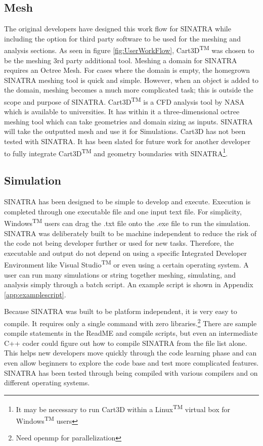 \subsection{Mesh}
The original developers have designed this work flow for SINATRA while including the option for third party software to be used for the meshing and analysis sections. As seen in figure \ref{fig:UserWorkFlow}, Cart3D\textsuperscript{TM} \cite{cart3d} was chosen to be the meshing 3rd party additional tool. Meshing a domain for SINATRA requires an Octree Mesh. For cases where the domain is empty, the homegrown SINATRA meshing tool is quick and simple. However, when an object is added to the domain, meshing becomes a much more complicated task; this is outside the scope and purpose of SINATRA. Cart3D\textsuperscript{TM} is a CFD analysis tool by NASA which is available to universities. It has within it a three-dimensional octree meshing tool which can take geometries and domain sizing as inputs. SINATRA will take the outputted mesh and use it for Simulations. Cart3D has not been tested with SINATRA. It has been slated for future work for another developer to fully integrate Cart3D\textsuperscript{TM} and geometry boundaries with SINATRA\footnote{It may be necessary to run Cart3D within a Linux\textsuperscript{TM} virtual box for Windows\textsuperscript{TM} users}. \par

\subsection{Simulation}

SINATRA has been designed to be simple to develop and execute. Execution is completed through one executable file and one input text file. For simplicity, Windows\textsuperscript{TM} users can drag the .txt file onto the .exe file to run the simulation. SINATRA was deliberately built to be machine independent to reduce the risk of the code not being developer further or used for new tasks. Therefore, the executable and output do not depend on using a specific Integrated Developer Environment like Visual Studio\textsuperscript{TM} or even using a certain operating system. A user can run many simulations or string together meshing, simulating, and analysis simply through a batch script. An example script is shown in Appendix \ref{app:examplescript}. \par
\indent Because SINATRA was built to be platform independent, it is very easy to compile. It requires only a single command with zero libraries.\footnote{Need openmp for parallelization} There are sample compile statements in the ReadME and compile scripts, but even an intermediate C++ coder could figure out how to compile SINATRA from the file list alone. This helps new developers move quickly through the code learning phase and can even allow beginners to explore the code base and test more complicated features. SINATRA has been tested through being compiled with various compilers and on different operating systems.  

